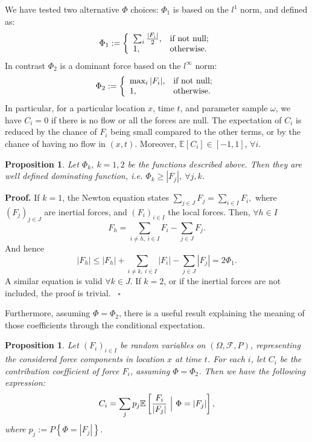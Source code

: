 \documentclass{article}
\newtheorem{proposition}[theorem]{Proposition}
\newenvironment{proof}[1][Proof]{\noindent\textbf{#1.} }{\ $\square$}
\begin{document}
We have tested two alternative $\Phi$ choices: $\Phi_1$ is based on the $l^1$ norm, and defined as:
$$\Phi_1:=\left\{
    \begin{array}{ll}
      \sum_i \frac{|F_i|}{2}, & \hbox{if not null;} \\
      1, & \hbox{otherwise.}
    \end{array}
  \right.$$
In contrast $\Phi_2$ is a dominant force based on the $l^\infty$ norm:
$$\Phi_2:=\left\{
    \begin{array}{ll}
      \max_i |F_i|, & \hbox{if not null;} \\
      1, & \hbox{otherwise.}
    \end{array}
  \right.$$
In particular, for a particular location $x$, time $t$, and parameter sample $\omega$, we have $C_i=0$ if there is no flow or all the forces are null. The expectation of $C_i$ is reduced by the chance of $F_i$ being small compared to the other terms, or by the chance of having no flow in $(x,t)$. Moreover, $\mathbb E[C_i]\in[-1,1]$, $\forall i$.
\begin{proposition}
Let $\Phi_k$, $k=1,2$ be the functions described above. Then they are well defined dominating function, i.e. $\Phi_k\ge |F_j|$, $\forall j,k$.
\end{proposition}
\begin{proof}
If $k=1$, the Newton equation states $\sum_{j\in J} F_j =\sum_{i\in I} F_i,$ where $(F_j)_{j\in J}$ are inertial forces, and $(F_i)_{i\in I}$ the local forces. Then, $\forall h\in I$
$$F_h=\sum_{i\neq h,\ i\in I} F_i - \sum_{j\in J} F_j.$$
And hence
$$|F_h|\le |F_h|+\sum_{i\neq k,\ i\in I} |F_i| - \sum_{j\in J} |F_j|=2\Phi_1.$$
A similar equation is valid $\forall k\in J$. If $k=2$, or if the inertial forces are not included, the proof is trivial.
\end{proof}

Furthermore, assuming $\Phi=\Phi_2$, there is a useful result explaining the meaning of those coefficients through the conditional expectation.
\begin{proposition}
Let $(F_i)_{i\in I}$ be random variables on $(\Omega, \mathcal F, P)$, representing the considered force components in location $x$ at time $t$. For each $i$, let $C_i$ be the contribution coefficient of force $F_i$, assuming $\Phi=\Phi_2$. Then we have the following expression:
$$C_i=\sum_j p_j \mathbb E\left[\frac{F_i}{|F_j|}\ \Big{|}\ \Phi=|F_j|\right],$$
where $p_j:=P\left\{\Phi=|F_j|\right\}$.
\end{proposition}
\end{document}

